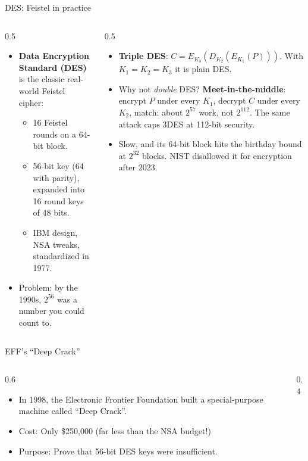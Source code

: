 \ifdefined\PRESENTATION\else\PassOptionsToClass{handout}{beamer}\fi\documentclass[aspectratio=169, lualatex]{beamer}
\begin{document}
\begin{frame}{DES: Feistel in practice}
	\begin{columns}[c]
		\begin{column}{0.5\textwidth}
			\begin{itemize}
				\item \textbf{Data Encryption Standard (DES)} is the classic real-world Feistel cipher:
				      \begin{itemize}
					      \item 16 Feistel rounds on a 64-bit block.
					      \item 56-bit key (64 with parity), expanded into 16 round keys of 48 bits.
					      \item IBM design, NSA tweaks, standardized in 1977.
				      \end{itemize}
				\item Problem: by the 1990s, $2^{56}$ was a number you could count to.
			\end{itemize}
		\end{column}
		\begin{column}{0.5\textwidth}
			\begin{itemize}
				\item \textbf{Triple DES}: $C = E_{K_3}(D_{K_2}(E_{K_1}(P)))$. With $K_1 = K_2 = K_3$ it is plain DES.
				\item Why not \emph{double} DES? \textbf{Meet-in-the-middle}: encrypt $P$ under every $K_1$, decrypt $C$ under every $K_2$, match: about $2^{57}$ work, not $2^{112}$. The same attack caps 3DES at 112-bit security.
				\item Slow, and its 64-bit block hits the birthday bound at $2^{32}$ blocks. NIST disallowed it for encryption after 2023.
			\end{itemize}
		\end{column}
	\end{columns}
\end{frame}

\begin{frame}{EFF's ``Deep Crack''}
	\begin{columns}[c]
		\begin{column}{0.6\textwidth}
			\begin{itemize}
				\item In 1998, the Electronic Frontier Foundation built a special-purpose machine called ``Deep Crack''.
				\item Cost: Only \$250,000 (far less than the NSA budget!)
				\item Purpose: Prove that 56-bit DES keys were insufficient.
			\end{itemize}
		\end{column}
		\begin{column}{0.4\textwidth}
		\end{column}
	\end{columns}
\end{frame}
\end{document}
